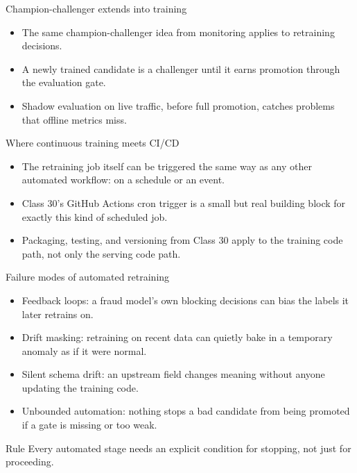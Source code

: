 \begin{frame}{Champion-challenger extends into training}
\begin{itemize}
\item The same champion-challenger idea from monitoring applies to retraining decisions.
\item A newly trained candidate is a challenger until it earns promotion through the evaluation gate.
\item Shadow evaluation on live traffic, before full promotion, catches problems that offline metrics miss.
\end{itemize}
\coursefooter
\end{frame}

\begin{frame}{Where continuous training meets CI/CD}
\begin{itemize}
\item The retraining job itself can be triggered the same way as any other automated workflow: on a schedule or an event.
\item Class 30's GitHub Actions cron trigger is a small but real building block for exactly this kind of scheduled job.
\item Packaging, testing, and versioning from Class 30 apply to the training code path, not only the serving code path.
\end{itemize}
\coursefooter
\end{frame}

\begin{frame}{Failure modes of automated retraining}
\begin{itemize}
\item Feedback loops: a fraud model's own blocking decisions can bias the labels it later retrains on.
\item Drift masking: retraining on recent data can quietly bake in a temporary anomaly as if it were normal.
\item Silent schema drift: an upstream field changes meaning without anyone updating the training code.
\item Unbounded automation: nothing stops a bad candidate from being promoted if a gate is missing or too weak.
\end{itemize}
\begin{block}{Rule}
Every automated stage needs an explicit condition for stopping, not just for proceeding.
\end{block}
\coursefooter
\end{frame}

